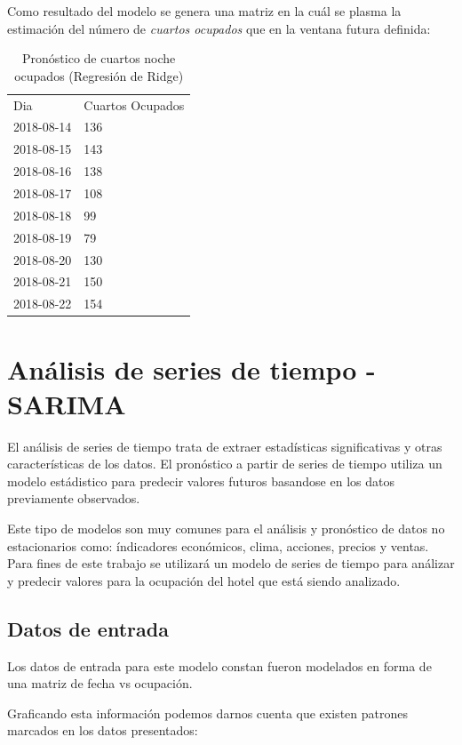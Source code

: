 Como resultado del modelo se genera una matriz en la cuál se plasma la estimación del número de \emph{cuartos ocupados} que en la ventana futura definida:

\begin{table}[H]
\centering
\begin{tabular}{ll}
Dia        & Cuartos Ocupados \\
2018-08-14 & 136              \\
2018-08-15 & 143              \\
2018-08-16 & 138              \\
2018-08-17 & 108              \\
2018-08-18 & 99               \\
2018-08-19 & 79               \\
2018-08-20 & 130              \\
2018-08-21 & 150              \\
2018-08-22 & 154              
\end{tabular}
\caption{Pronóstico de cuartos noche ocupados (Regresión de Ridge)} 
\end{table}

\section*{Análisis de series de tiempo - SARIMA}

El análisis de series de tiempo trata de extraer estadísticas significativas y otras características de los datos. El pronóstico a partir de series de tiempo utiliza un modelo estádistico para predecir valores futuros basandose en los datos previamente observados.

Este tipo de modelos son muy comunes para el análisis y pronóstico de datos no estacionarios como: índicadores económicos, clima, acciones, precios y ventas. Para fines de este trabajo se utilizará un modelo de series de tiempo para análizar y predecir valores para la ocupación del hotel que está siendo analizado.

\subsection*{Datos de entrada}

Los datos de entrada para este modelo constan fueron modelados en forma de una matriz de fecha vs ocupación.

Graficando esta información podemos darnos cuenta que existen patrones marcados en los datos presentados:

